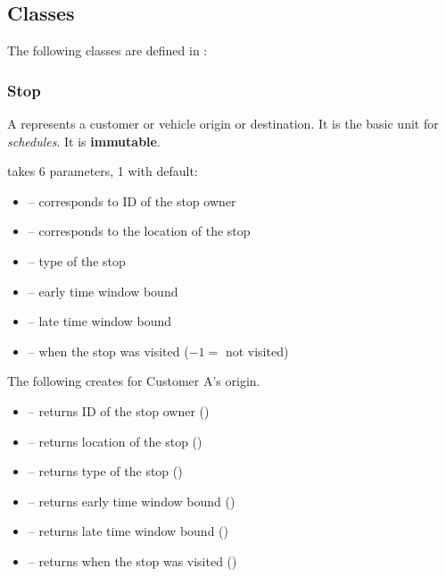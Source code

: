 \subsection{Classes}

The following classes are defined in :

\subsubsection{Stop}

A  represents a customer or vehicle origin or destination. It is
the basic unit for \emph{schedules}. It is \textbf{immutable}.

  takes 6 parameters, 1 with default:
\begin{itemize}
    \item[]  -- corresponds to ID of the stop owner
    \item[]  -- corresponds to the location of the stop
    \item[]  -- type of the stop
    \item[]  -- early time window bound
    \item[]  -- late time window bound
    \item[]  -- when the stop was visited ($-1=$ not visited)
\end{itemize}

The following creates  for Customer A's origin.


\begin{itemize}
    \item[]  -- returns ID of the stop owner ()
    \item[]  -- returns location of the stop ()
    \item[]  -- returns type of the stop ()
    \item[]  -- returns early time window bound ()
    \item[]  -- returns late time window bound ()
    \item[]  -- returns when the stop was visited ()
\end{itemize}

